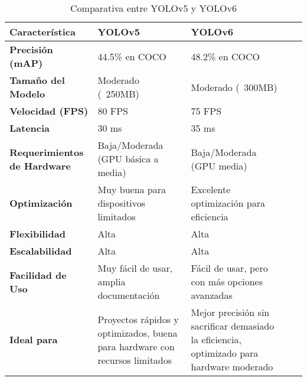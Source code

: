 \begin{table}[H]
\centering
\renewcommand{\arraystretch}{1.5}
\caption{Comparativa entre YOLOv5 y YOLOv6}
\label{tab:yolo_comparison2}
\begin{tabular}{|p{3cm}|p{3cm}|p{3cm}|p{3cm}|p{4cm}|}
\hline
\textbf{Característica}         & \textbf{YOLOv5}                             & \textbf{YOLOv6}                             \\ \hline
\textbf{Precisión (mAP)}        & 44.5\% en COCO                              & 48.2\% en COCO                              \\ \hline
\textbf{Tamaño del Modelo}      & Moderado (~250MB)                          & Moderado (~300MB)                          \\ \hline
\textbf{Velocidad (FPS)}        & 80 FPS                   & 75 FPS                                      \\ \hline
\textbf{Latencia}               & 30 ms                                      & 35 ms                                       \\ \hline
\textbf{Requerimientos de Hardware} & Baja/Moderada (GPU básica a media)        & Baja/Moderada (GPU media)                  \\ \hline
\textbf{Optimización}           & Muy buena para dispositivos limitados      & Excelente optimización para eficiencia     \\ \hline
\textbf{Flexibilidad}           & Alta                                       & Alta                                       \\ \hline
\textbf{Escalabilidad}          & Alta                                       & Alta                                       \\ \hline
\textbf{Facilidad de Uso}       & Muy fácil de usar, amplia documentación    & Fácil de usar, pero con más opciones avanzadas \\ \hline
\textbf{Ideal para}             & Proyectos rápidos y optimizados, buena para hardware con recursos limitados & Mejor precisión sin sacrificar demasiado la eficiencia, optimizado para hardware moderado \\ \hline
\end{tabular}
\end{table}






